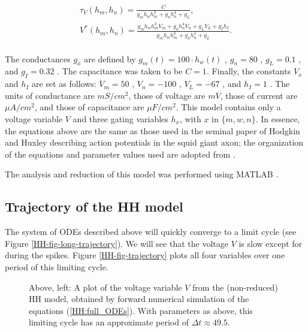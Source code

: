\documentclass{llncs}
\begin{document}
    \begin{gather*} \tau_V(h_m,h_n) =  \frac{ {C}}{g_m  {h_w} h_m^3+g_n h_n^4+g_L},
        \\[10pt]     V^*(h_m,h_n)    =   { \frac{g_m h_w h_m^3V_m+g_nh_n^4V_n+g_LV_L+g_Ih_I}{g_m h_w h_m^3+g_n h_n^4+g_L}} .
    \end{gather*}
    \\[5pt]
    The conductances $g_x$ are defined by       $ g_m(t) =    100\cdot h_w(t) $%
                                        ,       $ g_n    =    80              $%
                                        ,       $ g_L    =    0.1             $%
                                        , and   $ g_I    =    0.32            $%
                                        .
     {The capacitance was taken to be $C = 1$.}
    Finally, the constants $V_x$ and $h_I$
    are set as follows:         $  V_m = 50  $%
                      ,         $ V_n = -100 $%
                      ,         $ V_L = -67  $%
                      ,  and    $ h_I = 1    $%
                      .
     {The units of   conductance are $mS/cm^2$, those of voltage are $mV$, those of current are $\mu A/cm^2$, and those of capacitance are $\mu F/cm^2$.}
	This model contains only a voltage variable $V$ and three gating variables
	$h_x$, with $x$ in $\{m,w,n\}$. In essence, the equations above are the
	same as those used in the seminal paper of Hodgkin and Huxley
	\cite{hodgkin1952propagation} describing action potentials in the squid
	giant axon; the organization of the equations and parameter values used are
	adopted from \cite{clewley2004dominant}.

 {The analysis and reduction of this model was performed using MATLAB \cite{MATLAB:2013}. }

\iffalse\FloatBarrier\fi
\subsection{Trajectory of the HH model}

    The system of ODEs described above will quickly converge to a limit
    cycle (see Figure \ref{HH-fig-long-trajectory}).
    We will see that the voltage $V$ is slow except for during the spikes.
    Figure \ref{HH-fig-trajectory} plots all four variables over one period of
    this limiting cycle.

	\begin{figure}[h!]
	\centering
			
		\caption{Above, left: A plot of the voltage variable $V$ from the (non-reduced)
					HH model, obtained by forward numerical simulation of
					the equations (\ref{HH:full_ODEs}). With parameters as above, this
					limiting cycle has an approximate period of $\Delta t\approx
					49.5$.}
	\end{figure}
\end{document}
